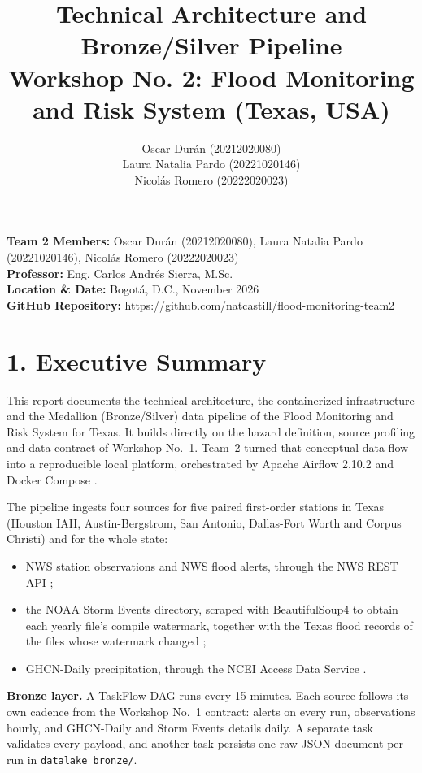 \documentclass[stu, 12pt, letterpaper, donotrepeattitle, floatsintext, natbib]{apa7}
\title{\Large Technical Architecture and Bronze/Silver Pipeline \\ \large Workshop No. 2: Flood Monitoring and Risk System (Texas, USA)}
\author{Oscar Durán (20212020080) \\ Laura Natalia Pardo (20221020146) \\ Nicolás Romero (20222020023)}
\affiliation{Universidad Distrital Francisco José de Caldas}
\begin{document}
\maketitle

\renewcommand\contentsname{\large Contents}
\tableofcontents
\setcounter{tocdepth}{2}
\newpage


\noindent \textbf{Team 2 Members:} Oscar Durán (20212020080), Laura Natalia Pardo (20221020146), Nicolás Romero (20222020023) \\
\textbf{Professor:} Eng. Carlos Andrés Sierra, M.Sc. \\
\textbf{Location \& Date:} Bogotá, D.C., November 2026 \\
\textbf{GitHub Repository:} \url{https://github.com/natcastill/flood-monitoring-team2}

\section{\large 1. Executive Summary}
This report documents the technical architecture, the containerized infrastructure and the Medallion (Bronze/Silver) data pipeline of the Flood Monitoring and Risk System for Texas. It builds directly on the hazard definition, source profiling and data contract of Workshop No.~1. Team~2 turned that conceptual data flow into a reproducible local platform, orchestrated by Apache Airflow 2.10.2 and Docker Compose \citep{apache2026, docker2026}.

The pipeline ingests four sources for five paired first-order stations in Texas (Houston IAH, Austin-Bergstrom, San Antonio, Dallas-Fort Worth and Corpus Christi) and for the whole state:
\begin{itemize}
    \item NWS station observations and NWS flood alerts, through the NWS REST API \citep{nws2026};
    \item the NOAA Storm Events directory, scraped with BeautifulSoup4 to obtain each yearly file's compile watermark, together with the Texas flood records of the files whose watermark changed \citep{noaa2026};
    \item GHCN-Daily precipitation, through the NCEI Access Data Service \citep{menne2012}.
\end{itemize}

\textbf{Bronze layer.} A TaskFlow DAG runs every 15 minutes. Each source follows its own cadence from the Workshop No.~1 contract: alerts on every run, observations hourly, and GHCN-Daily and Storm Events details daily. A separate task validates every payload, and another task persists one raw JSON document per run in \texttt{datalake\_bronze/}.
\end{document}

